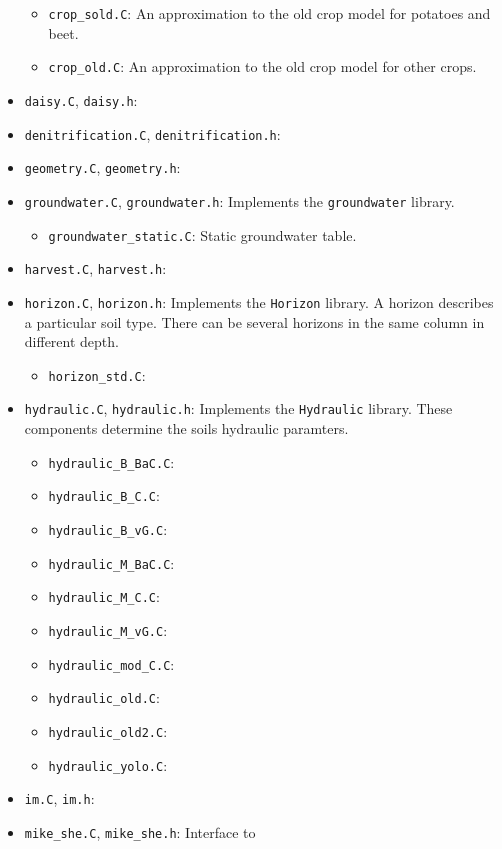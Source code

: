 \documentclass{article}
\newcommand{\code}[1]{\texttt{#1}}
\newcommand{\file}[1]{\texttt{#1}}
\begin{document}
\begin{itemize}
\begin{itemize}
  \item \file{crop\_sold.C}: An approximation to the old crop model
    for potatoes and beet.
  \item \file{crop\_old.C}: An approximation to the old crop model for
    other crops.
  \end{itemize}
\item \file{daisy.C}, \file{daisy.h}:
\item \file{denitrification.C}, \file{denitrification.h}:
\item \file{geometry.C}, \file{geometry.h}:
\item \file{groundwater.C}, \file{groundwater.h}:  Implements the
  \code{groundwater} library.
  \begin{itemize}
  \item \file{groundwater\_static.C}: Static groundwater table.
  \end{itemize}
\item \file{harvest.C}, \file{harvest.h}:
\item \file{horizon.C}, \file{horizon.h}: Implements the
  \code{Horizon} library.  A horizon describes a particular soil
  type.  There can be several horizons in the same column in different
  depth.
  \begin{itemize}
  \item \file{horizon\_std.C}:
  \end{itemize}
\item \file{hydraulic.C}, \file{hydraulic.h}: Implements the
  \code{Hydraulic} library.  These components determine the soils
  hydraulic paramters.
  \begin{itemize}
  \item \file{hydraulic\_B\_BaC.C}:
  \item \file{hydraulic\_B\_C.C}:
  \item \file{hydraulic\_B\_vG.C}:
  \item \file{hydraulic\_M\_BaC.C}:
  \item \file{hydraulic\_M\_C.C}:
  \item \file{hydraulic\_M\_vG.C}:
  \item \file{hydraulic\_mod\_C.C}:
  \item \file{hydraulic\_old.C}:
  \item \file{hydraulic\_old2.C}:
  \item \file{hydraulic\_yolo.C}:
  \end{itemize}
\item \file{im.C}, \file{im.h}:
\item \file{mike\_she.C}, \file{mike\_she.h}:  Interface to

\end{itemize}
\end{document}

